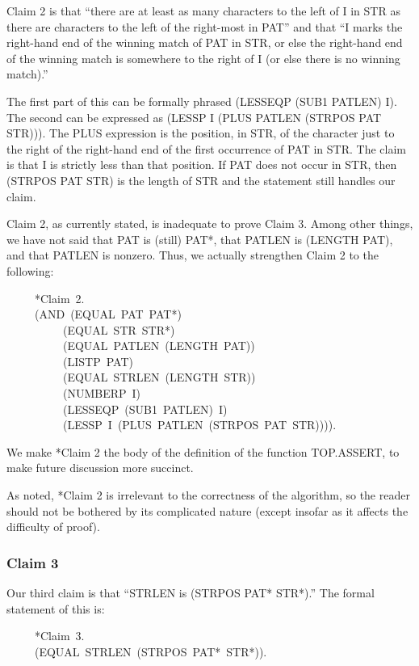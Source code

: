 \documentclass[10pt]{book}
\newenvironment{pubasis}{\begin{flushleft}}{\end{flushleft}}
\begin{document}
Claim 2 is that ``there are at least as many characters to the left
of I in STR as there are characters to the left of the right-most
in PAT'' and that ``I marks the right-hand
end of the winning match of PAT in STR, or else the right-hand end of
the winning match is somewhere to the right of I (or else there is no winning
match).''

The first part of this can be formally phrased (LESSEQP (SUB1 PATLEN) I).
The second can be expressed as (LESSP I (PLUS PATLEN (STRPOS PAT STR))).  The PLUS expression is
the position, in STR, of the character just to the right of the right-hand end of the first
occurrence of PAT in STR.  The claim is that I is strictly less than
that position.  If PAT does not occur in STR, then (STRPOS PAT STR) is
the length of STR and the statement still handles our claim.

Claim 2, as currently stated, is inadequate to prove Claim 3.
Among other things, we have not said that PAT is (still) PAT*, that PATLEN is (LENGTH PAT),
and that PATLEN is nonzero.
Thus, we actually strengthen Claim 2 to the following:
\begin{pubasis}
~~~~~*Claim~2.\\
~~~~~(AND~(EQUAL~PAT~PAT*)\\
~~~~~~~~~~(EQUAL~STR~STR*)\\
~~~~~~~~~~(EQUAL~PATLEN~(LENGTH~PAT))\\
~~~~~~~~~~(LISTP~PAT)\\
~~~~~~~~~~(EQUAL~STRLEN~(LENGTH~STR))\\
~~~~~~~~~~(NUMBERP~I)\\
~~~~~~~~~~(LESSEQP~(SUB1~PATLEN)~I)\\
~~~~~~~~~~(LESSP~I~(PLUS~PATLEN~(STRPOS~PAT~STR)))).\\
\end{pubasis}
We  make *Claim 2 the body of the definition of the function
TOP.ASSERT,  to make future discussion more succinct.

As noted, *Claim 2 is irrelevant to the correctness of the
algorithm, so the reader should not be bothered by its complicated
nature (except insofar as it affects the difficulty of proof).
\subsubsection{Claim 3}
Our third claim is that ``STRLEN is (STRPOS PAT* STR*).''  The formal
statement of this is:

\begin{pubasis}
~~~~~*Claim~3.\\
~~~~~(EQUAL~STRLEN~(STRPOS~PAT*~STR*)).\\
\end{pubasis}
\end{document}
